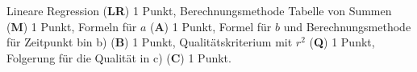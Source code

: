 \begin{bewertung}
Lineare Regression ({\bf LR}) 1 Punkt,
Berechnungsmethode Tabelle von Summen ({\bf M}) 1 Punkt,
Formeln für $a$ ({\bf A}) 1 Punkt,
Formel für $b$ und Berechnungsmethode für Zeitpunkt bin b)  ({\bf B}) 1 Punkt,
Qualitätskriterium mit $r^2$ ({\bf Q}) 1 Punkt,
Folgerung für die Qualität in c) ({\bf C}) 1 Punkt.
\end{bewertung}
